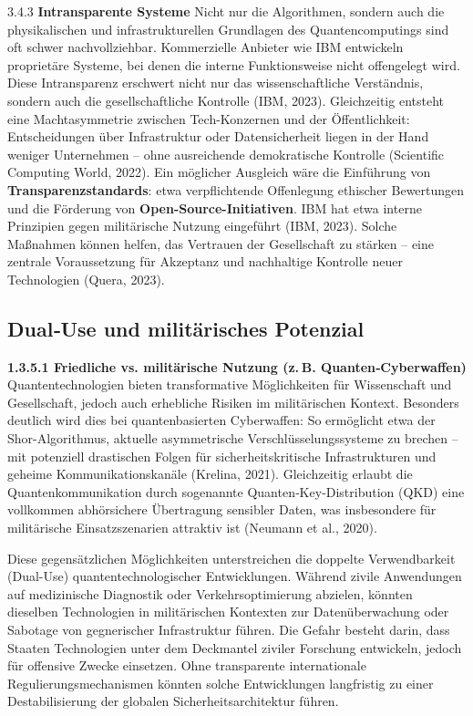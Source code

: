 3.4.3 \textbf{Intransparente Systeme }
Nicht nur die Algorithmen, sondern auch die physikalischen und infrastrukturellen Grundlagen des Quantencomputings sind oft schwer nachvollziehbar. Kommerzielle Anbieter wie IBM entwickeln proprietäre Systeme, bei denen die interne Funktionsweise nicht offengelegt wird. Diese Intransparenz erschwert nicht nur das wissenschaftliche Verständnis, sondern auch die gesellschaftliche Kontrolle (IBM, 2023).
Gleichzeitig entsteht eine Machtasymmetrie zwischen Tech-Konzernen und der Öffentlichkeit: Entscheidungen über Infrastruktur oder Datensicherheit liegen in der Hand weniger Unternehmen – ohne ausreichende demokratische Kontrolle (Scientific Computing World, 2022).
Ein möglicher Ausgleich wäre die Einführung von \textbf{Transparenzstandards}: etwa verpflichtende Offenlegung ethischer Bewertungen und die Förderung von \textbf{Open-Source-Initiativen}. IBM hat etwa interne Prinzipien gegen militärische Nutzung eingeführt (IBM, 2023). Solche Maßnahmen können helfen, das Vertrauen der Gesellschaft zu stärken – eine zentrale Voraussetzung für Akzeptanz und nachhaltige Kontrolle neuer Technologien (Quera, 2023).
 
\subsection{Dual‑Use und militärisches Potenzial}
\textbf{1.3.5.1 \textbf{Friedliche vs. militärische Nutzung (z. B. Quanten‑Cyberwaffen)} }
Quantentechnologien bieten transformative Möglichkeiten für Wissenschaft und Gesellschaft, jedoch auch erhebliche Risiken im militärischen Kontext. Besonders deutlich wird dies bei quantenbasierten Cyberwaffen: So ermöglicht etwa der Shor-Algorithmus, aktuelle asymmetrische Verschlüsselungssysteme zu brechen – mit potenziell drastischen Folgen für sicherheitskritische Infrastrukturen und geheime Kommunikationskanäle (Krelina, 2021). Gleichzeitig erlaubt die Quantenkommunikation durch sogenannte Quanten‑Key‑Distribution (QKD) eine vollkommen abhörsichere Übertragung sensibler Daten, was insbesondere für militärische Einsatzszenarien attraktiv ist (Neumann et al., 2020).

Diese gegensätzlichen Möglichkeiten unterstreichen die doppelte Verwendbarkeit (Dual-Use) quantentechnologischer Entwicklungen. Während zivile Anwendungen auf medizinische Diagnostik oder Verkehrsoptimierung abzielen, könnten dieselben Technologien in militärischen Kontexten zur Datenüberwachung oder Sabotage von gegnerischer Infrastruktur führen. Die Gefahr besteht darin, dass Staaten Technologien unter dem Deckmantel ziviler Forschung entwickeln, jedoch für offensive Zwecke einsetzen. Ohne transparente internationale Regulierungsmechanismen könnten solche Entwicklungen langfristig zu einer Destabilisierung der globalen Sicherheitsarchitektur führen.

